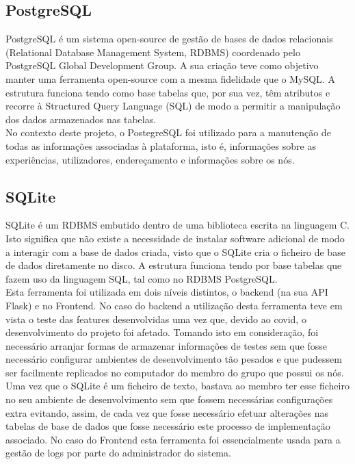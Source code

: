 \subsection{PostgreSQL}
PostgreSQL é um sistema open-source de gestão de bases de dados relacionais (Relational Database Management System, RDBMS) coordenado pelo PostgreSQL Global Development Group. A sua criação teve como objetivo manter uma ferramenta open-source com a mesma fidelidade que o MySQL.\cite{postgre}\newline
A estrutura funciona tendo como base tabelas que, por sua vez, têm atributos e recorre à Structured Query Language (SQL) de modo a permitir a manipulação dos dados armazenados nas tabelas.\newline\\
No contexto deste projeto, o PostegreSQL foi utilizado para a manutenção de todas as informações associadas à plataforma, isto é, informações sobre as experiências, utilizadores, endereçamento e informações sobre os nós.

\subsection{SQLite}
SQLite é um RDBMS embutido dentro de uma biblioteca escrita na linguagem C. Isto significa que não existe a necessidade de instalar software adicional de modo a interagir com a base de dados criada, visto que o SQLite cria o ficheiro de base de dados diretamente no disco.\cite{sqlite}\newline
A estrutura funciona tendo por base tabelas que fazem uso da linguagem SQL, tal como no RDBMS PostgreSQL. \newline\\
Esta ferramenta foi utilizada em dois níveis distintos, o backend (na sua API Flask) e no Frontend. \newline
No caso do backend a utilização desta ferramenta teve em vista o teste das features desenvolvidas uma vez que, devido ao covid, o desenvolvimento do projeto foi afetado. Tomando isto em consideração, foi necessário arranjar formas de armazenar informações de testes sem que fosse necessário configurar ambientes de desenvolvimento tão pesados e que pudessem ser facilmente replicados no computador do membro do grupo que possui os nós. Uma vez que o SQLite é um ficheiro de texto, bastava ao membro ter esse ficheiro no seu ambiente de desenvolvimento sem que fossem necessárias configurações extra evitando, assim, de cada vez que fosse necessário efetuar alterações nas tabelas de base de dados que fosse necessário este processo de implementação associado. \newline
No caso do Frontend esta ferramenta foi essencialmente usada para a gestão de logs por parte do administrador do sistema.


